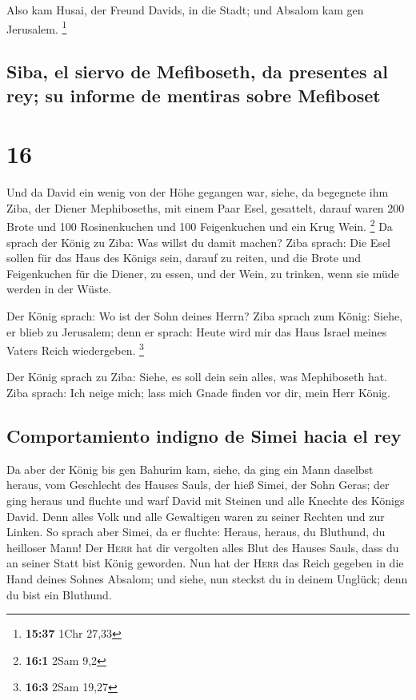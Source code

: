  Also kam Husai, der Freund Davids, in die Stadt; und
Absalom kam gen Jerusalem. \footnote{\textbf{15:37} 1Chr 27,33}

\hypertarget{siba-el-siervo-de-mefiboseth-da-presentes-al-rey-su-informe-de-mentiras-sobre-mefiboset}{%
\subsection{Siba, el siervo de Mefiboseth, da presentes al rey; su
informe de mentiras sobre
Mefiboset}\label{siba-el-siervo-de-mefiboseth-da-presentes-al-rey-su-informe-de-mentiras-sobre-mefiboset}}

\hypertarget{section-15}{%
\section{16}\label{section-15}}

 Und da David ein wenig von der Höhe gegangen war, siehe,
da begegnete ihm Ziba, der Diener Mephiboseths, mit einem Paar Esel,
gesattelt, darauf waren 200 Brote und 100 Rosinenkuchen und 100
Feigenkuchen und ein Krug Wein. \footnote{\textbf{16:1} 2Sam 9,2}
 Da sprach der König zu Ziba: Was willst du damit machen?
Ziba sprach: Die Esel sollen für das Haus des Königs sein, darauf zu
reiten, und die Brote und Feigenkuchen für die Diener, zu essen, und der
Wein, zu trinken, wenn sie müde werden in der Wüste.

 Der König sprach: Wo ist der Sohn deines Herrn? Ziba
sprach zum König: Siehe, er blieb zu Jerusalem; denn er sprach: Heute
wird mir das Haus Israel meines Vaters Reich wiedergeben. \footnote{\textbf{16:3}
  2Sam 19,27}

 Der König sprach zu Ziba: Siehe, es soll dein sein alles,
was Mephiboseth hat. Ziba sprach: Ich neige mich; lass mich Gnade finden
vor dir, mein Herr König.

\hypertarget{comportamiento-indigno-de-simei-hacia-el-rey}{%
\subsection{Comportamiento indigno de Simei hacia el
rey}\label{comportamiento-indigno-de-simei-hacia-el-rey}}

 Da aber der König bis gen Bahurim kam, siehe, da ging ein
Mann daselbst heraus, vom Geschlecht des Hauses Sauls, der hieß Simei,
der Sohn Geras; der ging heraus und fluchte  und warf
David mit Steinen und alle Knechte des Königs David. Denn alles Volk und
alle Gewaltigen waren zu seiner Rechten und zur Linken. 
So sprach aber Simei, da er fluchte: Heraus, heraus, du Bluthund, du
heilloser Mann!  Der \textsc{Herr} hat dir vergolten alles
Blut des Hauses Sauls, dass du an seiner Statt bist König geworden. Nun
hat der \textsc{Herr} das Reich gegeben in die Hand deines Sohnes
Absalom; und siehe, nun steckst du in deinem Unglück; denn du bist ein
Bluthund.

